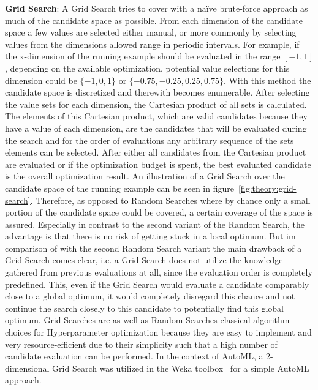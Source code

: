 \textbf{Grid Search}: A Grid Search tries to cover with a na\"ive brute-force approach as much of the candidate space as possible.
From each dimension of the candidate space a few values are selected either manual, or more commonly by selecting values from the dimensions allowed range in periodic intervals.
For example, if the x-dimension of the running example should be evaluated in the range $[-1,1]$, depending on the available optimization, potential value selections for this dimension could be $\{-1,0,1\}$ or $\{-0.75,-0.25,0.25,0.75\}$.
With this method the candidate space is discretized and therewith becomes enumerable.\newline
After selecting the value sets for each dimension, the Cartesian product of all sets is calculated.
The elements of this Cartesian product, which are valid candidates because they have a value of each dimension, are the candidates that will be evaluated during the search and for the order of evaluations any arbitrary sequence of the sets elements can be selected.
After either all candidates from the Cartesian product are evaluated or if the optimization budget is spent, the best evaluated candidate is the overall optimization result.
An illustration of a Grid Search over the candidate space of the running example can be seen in figure~\ref{fig:theory:grid-search}.\newline
Therefore, as opposed to Random Searches where by chance only a small portion of the candidate space could be covered, a certain coverage of the space is assured.
Especially in contrast to the second variant of the Random Search, the advantage is that there is no risk of getting stuck in a local optimum.
But im comparison of with the second Random Search variant the main drawback of a Grid Search comes clear, i.e. a Grid Search does not utilize the knowledge gathered from previous evaluations at all, since the evaluation order is completely predefined.
This, even if the Grid Search would evaluate a candidate comparably close to a global optimum, it would completely disregard this chance and not continue the search closely to this candidate to potentially find this global optimum.\newline
Grid Searches are as well as Random Searches classical algorithm choices for Hyperparameter optimization because they are easy to implement and very resource-efficient due to their simplicity such that a high number of candidate evaluation can be performed.
In the context of AutoML, a 2-dimensional Grid Search was utilized in the Weka toolbox~\cite{Witten-Weka} for a simple AutoML approach.
